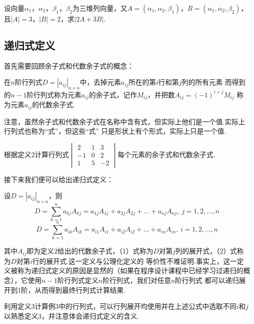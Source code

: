 \begin{example}
	设向量$\alpha_1$，$\alpha_2$，$\beta_1$，$\beta_2$为三维列向量，又$A=(\alpha_1,\alpha_2,\beta_1)$，$B=(\alpha_1,\alpha_2,\beta_2)$，
	且$|A|=3$，$|B|=2$，求$|2A+3B|$.
\end{example}

\subsection{递归式定义}
首先需要回顾余子式和代数余子式的概念：
\begin{definition}
	在$n$阶行列式$D=|a_{ij}|_{n \times n}$中，去掉元素$a_{ij}$所在的第$i$行和第$j$列的所有元素
	而得到的$n-1$阶行列式称为元素$a_{ij}$的余子式，记作$M_{ij}$，并把数$A_{ij}=(-1)^{i+j}M_{ij}$
	称为元素$a_{ij}$的代数余子式.
\end{definition}
注意，虽然余子式和代数余子式在名称中含有式，但实际上他们是一个值.实际上行列式也称为“式”，但这些“式”
只是形状上有个形式，实际上只是一个值.
\begin{example}
	根据定义$2$计算行列式$\begin{vmatrix}
		2 & 1 & 3 \\
		-1 & 0 & 2 \\
		1 & 5 & -2
	\end{vmatrix}$每个元素的余子式和代数余子式.
\end{example}

接下来我们便可以给出递归式定义：
\begin{definition}
	设$D=|a_{ij}|_{n \times n}$，则
	\begin{equation}
		D=\sum_{k=1}^{n}a_{kj}A_{kj}=a_{1j}A_{1j}+a_{2j}A_{2j}+\dots+a_{nj}A_{nj},\ j=1,2,\dots,n
	\end{equation}
	\begin{equation}
		D=\sum_{k=1}^{n}a_{ik}A_{ik}=a_{i1}A_{i1}+a_{i2}A_{i2}+\dots+a_{in}A_{in},\ i=1,2,\dots,n
	\end{equation}
\end{definition}
其中$A_{ij}$即为定义2给出的代数余子式，（1）式称为$D$对第$j$列的展开式，（2）式称为$D$对第$i$行的展开式.这一定义与公理化定义的
等价性不难证明.事实上，这一定义被称为递归式定义的原因是显然的（如果在程序设计课程中已经学习过递归的概念），它使用$n-1$阶行列式定义$n$阶行列式，我们对任意$n$阶行列式
都可以递归展开到1阶，从而得到最终行列式计算结果.
\begin{example}
	利用定义$3$计算例$3$中的行列式，可以行列展开均使用并在上述公式中选取不同$i$和$j$以熟悉定义$3$，并注意体会递归式定义的含义.
\end{example}

